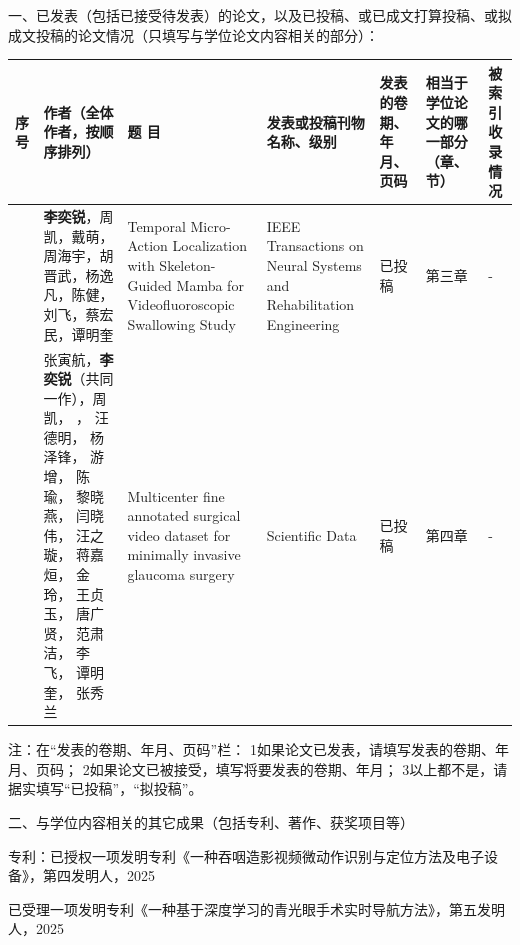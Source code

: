 
一、已发表（包括已接受待发表）的论文，以及已投稿、或已成文打算投稿、或拟成文投稿的论文情况（只填写与学位论文内容相关的部分）：

\begin{longtable}{|>{\centering}m{0.5cm}|>{\centering}m{3.5cm}|>{\centering}m{2.3cm}|>{\centering}m{2.6cm}|>{\centering}m{2cm}|>{\centering}m{1.3cm}|>{\centering}m{0.9cm}|}
\hline 
序号 & 作者（全体作者，按顺序排列） & 题 目 & 发表或投稿刊物名称、级别 & 发表的卷期、年月、页码 & 相当于学位论文的哪一部分（章、节） & 被索引收录情况\tabularnewline
\hline 
1 & \textbf{李奕锐}，周凯，戴萌，周海宇，胡晋武，杨逸凡，陈健，刘飞，蔡宏民，谭明奎 & Temporal Micro-Action Localization with Skeleton-Guided Mamba for Videofluoroscopic Swallowing Study & IEEE Transactions on Neural Systems and Rehabilitation Engineering & 已投稿 & 第三章 & - \tabularnewline
\hline 
2 & 张寅航，\textbf{李奕锐}（共同一作），周凯，
， 汪德明， 杨泽锋， 游增， 陈瑜， 黎晓燕， 闫晓伟， 汪之璇， 蒋嘉烜， 
金玲， 王贞玉， 唐广贤， 范肃洁， 李飞， 谭明奎， 张秀兰
& Multicenter fine annotated surgical video dataset for minimally invasive glaucoma surgery & Scientific Data & 已投稿 & 第四章 & - \tabularnewline
\hline
\end{longtable}

注：在“发表的卷期、年月、页码”栏：
1如果论文已发表，请填写发表的卷期、年月、页码；
2如果论文已被接受，填写将要发表的卷期、年月；
3以上都不是，请据实填写“已投稿”，“拟投稿”。

二、与学位内容相关的其它成果（包括专利、著作、获奖项目等）

专利：已授权一项发明专利《一种吞咽造影视频微动作识别与定位方法及电子设备》，第四发明人，2025

\quad\quad 已受理一项发明专利《一种基于深度学习的青光眼手术实时导航方法》，第五发明人，2025
